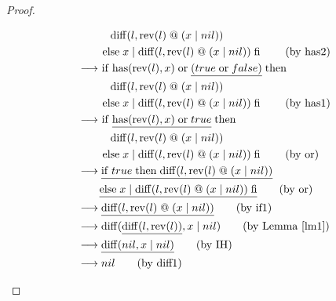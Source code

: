\documentclass[12pt, a4paper]{article}
\newcommand{\rel}[1]{\mathrel{#1}}
\newcommand{\rmx}[1]{\mathrm{#1}}
\newcommand{\larrow}{\longrightarrow}
\newcommand{\under}{\underline}
\begin{document}
\begin{proof}
\begin{description}
\begin{align*}
	&\quad \quad \quad \rmx{diff}(l, \rmx{rev}(l) \rel{@} (x \rel{|} nil)) \\
	&\quad \quad \rel{\rmx{else}} x \rel{|} \rmx{diff}(l, \rmx{rev}(l) \rel{@}(x \rel{|} nil)) \rel{\rmx{fi}} \tag{by has2} \\
	&\larrow\ \rel{\rmx{if}} \rmx{has}(\rmx{rev}(l), x) \rel{\rmx{or}} \under{(true \rel{\rmx{or}} false)} \rel{\rmx{then}} \\
	&\quad \quad \quad \rmx{diff}(l, \rmx{rev}(l) \rel{@} (x \rel{|} nil)) \\
	&\quad \quad \rel{\rmx{else}} x \rel{|} \rmx{diff}(l, \rmx{rev}(l) \rel{@}(x \rel{|} nil)) \rel{\rmx{fi}} \tag{by has1} \\
	&\larrow\ \rel{\rmx{if}} \under{\rmx{has}(\rmx{rev}(l), x) \rel{\rmx{or}} true} \rel{\rmx{then}} \\
	&\quad \quad \quad \rmx{diff}(l, \rmx{rev}(l) \rel{@} (x \rel{|} nil)) \\
	&\quad \quad \rel{\rmx{else}} x \rel{|} \rmx{diff}(l, \rmx{rev}(l) \rel{@}(x \rel{|} nil)) \rel{\rmx{fi}} \tag{by or} \\
	&\larrow \under{\rel{\rmx{if}} true \rel{\rmx{then}} \rmx{diff}(l, \rmx{rev}(l) \rel{@} (x \rel{|} nil))} \\
	&\quad \quad \under{\rel{\rmx{else}} x \rel{|} \rmx{diff}(l, \rmx{rev}(l) \rel{@}(x \rel{|} nil)) \rel{\rmx{fi}}} \tag{by or} \\
	&\larrow \under{\rmx{diff}(l, \rmx{rev}(l) \rel{@} (x \rel{|} nil))} \tag{by if1} \\
	&\larrow \rmx{diff}(\under{\rmx{diff}(l, \rmx{rev}(l))}, x \rel{|} nil) \tag{by Lemma~\ref{lm1}} \\	
&\larrow \under{\rmx{diff}(nil, x \rel{|} nil)} \tag{by IH} \\
&\larrow nil \tag{by diff1}
\end{align*}

\end{description}

\end{proof}
\end{document}

